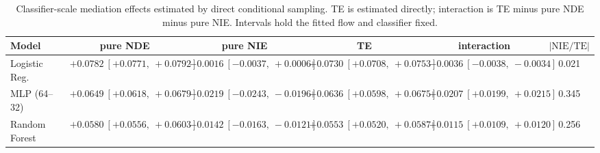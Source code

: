 \begin{table}[htbp]
  \centering
  \caption{Classifier-scale mediation effects estimated by direct conditional sampling. TE is estimated directly; interaction is TE minus pure NDE minus pure NIE. Intervals hold the fitted flow and classifier fixed.}
  \label{tab:acs_gap_overall}
  \begin{tabular}{lccccc}
    \toprule
    Model & pure NDE & pure NIE & TE & interaction & $|\mathrm{NIE}/\mathrm{TE}|$ \\
    \midrule
    Logistic Reg. & $+0.0782\ [+0.0771,\ +0.0792]$ & $-0.0016\ [-0.0037,\ +0.0006]$ & $+0.0730\ [+0.0708,\ +0.0753]$ & $-0.0036\ [-0.0038,\ -0.0034]$ & 0.021 \\
    MLP (64--32) & $+0.0649\ [+0.0618,\ +0.0679]$ & $-0.0219\ [-0.0243,\ -0.0196]$ & $+0.0636\ [+0.0598,\ +0.0675]$ & $+0.0207\ [+0.0199,\ +0.0215]$ & 0.345 \\
    Random Forest & $+0.0580\ [+0.0556,\ +0.0603]$ & $-0.0142\ [-0.0163,\ -0.0121]$ & $+0.0553\ [+0.0520,\ +0.0587]$ & $+0.0115\ [+0.0109,\ +0.0120]$ & 0.256 \\
    \bottomrule
  \end{tabular}
\end{table}